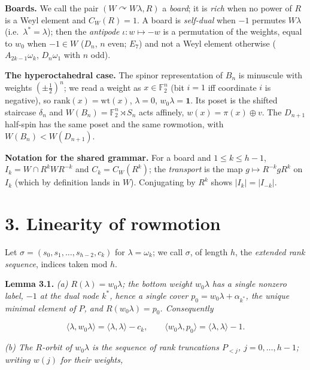 \documentclass[
]{article}
\begin{document}
\textbf{Boards.} We call the pair \((W \curvearrowright W\lambda, R)\) a
\emph{board}; it is \emph{rich} when no power of \(R\) is a Weyl element
and \(C_W(R) = 1\). A board is \emph{self-dual} when \(-1\) permutes
\(W\lambda\) (i.e.~\(\lambda^* = \lambda\)); then the \emph{antipode}
\(\iota: w \mapsto -w\) is a permutation of the weights, equal to
\(w_0\) when \(-1 \in W\) (\(D_n\), \(n\) even; \(E_7\)) and not a Weyl
element otherwise (\(A_{2k-1}\omega_k\), \(D_n\omega_1\) with \(n\)
odd).

\textbf{The hyperoctahedral case.} The spinor representation of \(B_n\)
is minuscule with weights \((\pm\tfrac12)^n\); we read a weight as
\(x \in \mathbb{F}_2^n\) (bit \(i = 1\) iff coordinate \(i\) is
negative), so \(\mathrm{rank}(x) = \mathrm{wt}(x)\), \(\lambda = 0\),
\(w_0\lambda = \mathbf{1}\). Its poset is the shifted staircase
\(\delta_n\) and \(W(B_n) = \mathbb{F}_2^n \rtimes S_n\) acts affinely,
\(w(x) = \pi(x) \oplus v\). The \(D_{n+1}\) half-spin has the same poset
and the same rowmotion, with \(W(B_n) < W(D_{n+1})\).

\textbf{Notation for the shared grammar.} For a board and
\(1 \le k \le h-1\), \(I_k = W \cap R^kWR^{-k}\) and \(C_k = C_W(R^k)\);
the \emph{transport} is the map \(g \mapsto R^{-k} g R^{k}\) on \(I_k\)
(which by definition lands in \(W\)). Conjugating by \(R^k\) shows
\(|I_k| = |I_{-k}|\).

\section{3. Linearity of rowmotion}\label{linearity-of-rowmotion}

Let \(\sigma = (s_0, s_1, \dots, s_{h-2}, c_k)\) for
\(\lambda = \omega_k\); we call \(\sigma\), of length \(h\), the
\emph{extended rank sequence}, indices taken mod \(h\).

\textbf{Lemma 3.1.} \emph{(a) \(R(\lambda) = w_0\lambda\); the bottom
weight \(w_0\lambda\) has a single nonzero label, \(-1\) at the dual
node \(k^*\), hence a single cover \(p_0 = w_0\lambda + \alpha_{k^*}\),
the unique minimal element of \(P\), and \(R(w_0\lambda) = p_0\).
Consequently}

\[\langle \lambda, w_0\lambda \rangle = \langle \lambda, \lambda \rangle - c_k, \qquad \langle w_0\lambda, p_0 \rangle = \langle \lambda, \lambda \rangle - 1 .\]

\emph{(b) The \(R\)-orbit of \(w_0\lambda\) is the sequence of rank
truncations \(P_{<j}\), \(j = 0, \dots, h-1\); writing \(w(j)\) for
their weights,}
\end{document}
